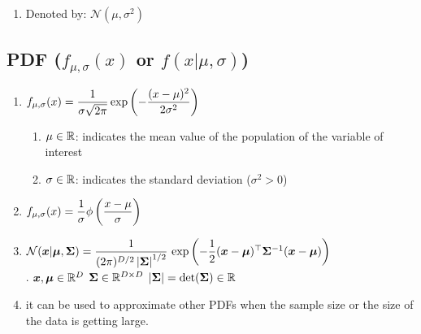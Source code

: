 \begin{enumerate}
    \item Denoted by: $\mathcal{N}(\mu, \sigma^2)$
\end{enumerate}


\subsection{PDF ($f_{\mu, \sigma}(x)$ or $f(x|\mu, \sigma)$)}

\begin{enumerate}
    \item  $
        f_{\mu, \sigma}(x)
        = \dfrac{1}{\sigma\sqrt{2\pi}} \exp\left(-\dfrac{(x-\mu)^2}{2\sigma^2}\right)
    $
    \hfill \cite{statistics/book/Statistics-for-Data-Scientists/Maurits-Kaptein}
    \begin{enumerate}
        \item[] $\mu \in \mathbb{R}$: indicates the mean value of the population of the variable of interest
        \hfill \cite{statistics/book/Statistics-for-Data-Scientists/Maurits-Kaptein}

        \item[] $\sigma \in \mathbb{R}$: indicates the standard deviation ($\sigma^2 > 0$)
        \hfill \cite{statistics/book/Statistics-for-Data-Scientists/Maurits-Kaptein}
    \end{enumerate}

    \item $f_{\mu, \sigma}(x) = \dfrac{1}{\sigma}\phi\left(\dfrac{x-\mu}{\sigma}\right)$
    \hfill \cite{statistics/book/Statistics-for-Data-Scientists/Maurits-Kaptein}

    \item
    $
        \mathcal{N}(\bm{x}|\bm{\mu}, \bm{\Sigma})
        = \dfrac{1}{(2\pi)^{D/2} \left| \bm{\Sigma} \right|^{1/2}} \,
        \exp\left(
            -\dfrac{1}{2}
            (\bm{x} - \bm{\mu})^\top \bm{\Sigma}^{-1} (\bm{x} - \bm{\mu})
        \right)
    $
    \hfill \cite{ml/book/Pattern-Recognition-And-Machine-Learning/Christopher-M-Bishop}
    \\[0.2cm]
    .\hfill
    $\bm{x}, \bm{\mu} \in \mathbb{R}^D$
    \hfill
    $\bm{\Sigma} \in \mathbb{R}^{D \times D}$
    \hfill
    $\left| \bm{\Sigma} \right| = \det(\bm{\Sigma}) \in \mathbb{R}$
    \hfill \cite{ml/book/Pattern-Recognition-And-Machine-Learning/Christopher-M-Bishop}

    \item it can be used to approximate other PDFs when the sample size or the size of the data is getting large.
    \hfill \cite{statistics/book/Statistics-for-Data-Scientists/Maurits-Kaptein}


\end{enumerate}
